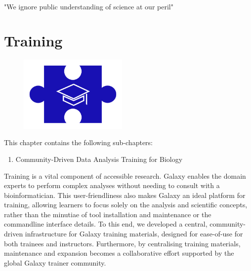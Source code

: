 \begin{savequote}[75mm]
"We ignore public understanding of science at our peril"
\end{savequote}

\chapter{Training}\label{chapter:training}

\begin{figure}[t!]
\includegraphics[height=10em]{frontmatter/images/chapter-header-training.png}
\end{figure}
\setcounter{figure}{-1}
\setcounter{table}{-1}
\setcounter{section}{-1}

This chapter contains the following sub-chapters:

\begin{enumerate}[label=\ref{chapter:training}.\arabic*]
\itemsep-0.5em
\item Community-Driven Data Analysis Training for Biology
\end{enumerate}


Training is a vital component of accessible research. Galaxy enables the domain experts to perform complex analyses without needing to consult with a bioinformatician. This user-friendliness also makes Galaxy an ideal platform for training, allowing learners to focus solely on the analysis and scientific concepts, rather than the minutiae of tool installation and maintenance or the commandline interface details. To this end, we developed a central, community-driven infrastructure for Galaxy training materials, designed for ease-of-use for both trainees and instructors. Furthermore, by centralising training materials, maintenance and expansion becomes a collaborative effort supported by the global Galaxy trainer community.
